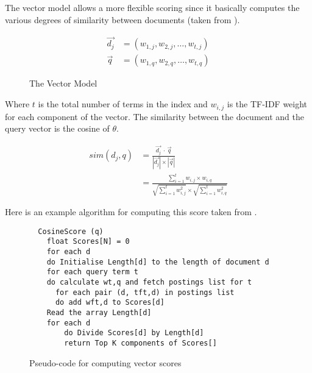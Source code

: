 The vector model allows a more flexible scoring since it basically computes the various degrees of similarity between documents (taken from \autocite[p.78]{Baeza-Yates2011}).

\begin{equation}
  \begin{split}
  \vec{d_j} &= (w_{1,j}, w_{2,j}, \ldots, w_{t,j})\\
  \vec{q} &= (w_{1,q}, w_{2,q}, \ldots, w_{t,q})
  \end{split}
  \label{eq:vector}
\end{equation}

\begin{figure}[htb] %
  \centering
\caption[Vector Model]{The Vector Model}
\label{fig:VM}
\end{figure}

Where $t$ is the total number of terms in the index and $w_{i,j}$ is the TF-IDF weight for each component of the vector. The similarity between the document and the query vector is the cosine of $\theta$.

\begin{equation}
  \begin{split}
  sim(d_j,q) &= \frac{\vec{d_j} \ \cdot \ \vec{q}}{|\vec{d_j}| \times |\vec{q}|}\\
  &= \frac{\sum_{i=1}^{t}w_{i,j} \times w_{i,q}}
  {\sqrt{\sum_{i=1}^{t}w_{i,j}^{2}} \times \sqrt{\sum_{i=1}^{t}w_{i,q}^{2}}}
  \end{split}
  \label{eq:sim2}
\end{equation}

Here is an example algorithm for computing this score taken from \autocite[p.125]{Manning2009}.

\begin{figure}[htb]
  \begin{lstlisting}
  CosineScore (q)
    float Scores[N] = 0
    for each d
    do Initialise Length[d] to the length of document d
    for each query term t
    do calculate wt,q and fetch postings list for t
      for each pair (d, tft,d) in postings list
      do add wft,d to Scores[d]
    Read the array Length[d]
    for each d
    	do Divide Scores[d] by Length[d]
    	return Top K components of Scores[]
  \end{lstlisting}
\caption[Pseudo-code for computing vector scores]{Pseudo-code for computing vector scores}
\label{fig:VectorScores}
\end{figure}

